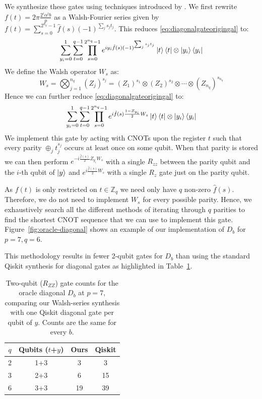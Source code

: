 \documentclass[aps,floatfix,10pt,amssymb,amsfont,amsmath,superscriptaddress,float,nofootinbib,longbibliography,nobalancelastpage,twocolumn]{revtex4-2}
\begin{document}
We synthesize these gates using techniques introduced by \cite{Welch_2014}. We first rewrite $f(t)= 2\pi  \frac{2^i\alpha^t b}{p}$ as a Walsh-Fourier series given by $f(t) = \sum_{s=0}^{2^{n_q}-1} \hat f(s) (-1)^{\sum_{j}s_jt_j}$. This reduces \eqref{eq:diagonalgateorigingal} to:
\begin{equation}
        \sum_{y_i=0}^1\sum_{t=0}^{q-1} \prod_{s=0}^{2^{n_q}-1}
        e^{iy_i \hat f(s)(-1)^{\sum_{j}s_jt_j}}\ket{t}\bra{t} \otimes \ket{y_i}\bra{y_i}
\end{equation}
We define the Walsh operator $W_s$ as:
\begin{equation}
    W_s = \bigotimes_{j=1}^{n_q} (Z_j)^{s_j} = (Z_1)^{s_1}\otimes (Z_2)^{s_2} \otimes \cdots \otimes (Z_{n_q})^{s_{n_q}}
\end{equation}
Hence we can further reduce \eqref{eq:diagonalgateorigingal} to:
\begin{equation}
        \sum_{y_i=0}^1\sum_{t=0}^{q-1} \prod_{s=0}^{2^{n_q}-1}
        e^{i\hat f(s)\frac{1-Z_{y_i}}{2} W_s}\ket{t}\bra{t} \otimes \ket{y_i}\bra{y_i}
\end{equation}
We implement this gate by acting with CNOTs upon the register $t$ such that every parity $\oplus_{j}t_j^{s_j}$ occurs at least once on some qubit. When that parity is stored we can then perform $e^{-i\frac{\hat f(s)}{2} Z_{y_i}W_s}$ with a single $R_{zz}$ between the parity qubit and the $i$-th qubit of $\ket{y}$ and $e^{i\frac{\hat f(s)}{2} W_s}$ with a single $R_z$ gate just on the parity qubit. 

As $f(t)$ is only restricted on $t \in \mathbb{Z}_q$ we need only have $q$ non-zero $\hat f(s)$. Therefore, we do not need to implement $W_s$ for every possible parity. Hence, we exhaustively search all the different methods of iterating through $q$ parities to find the shortest CNOT sequence that we can use to implement this gate. Figure~\ref{fig:oracle-diagonal} shows an example of our implementation of $D_b$ for $p=7, q=6$.

This methodology results in fewer 2-qubit gates for $D_b$ than using the standard Qiskit synthesis for diagonal gates \cite{shende2005synthesis} as highlighted in Table~\ref{tab:diagonal}.
\begin{table}[t]
\caption{Two-qubit ($R_{ZZ}$) gate counts for the oracle diagonal $D_b$ at $p=7$, comparing our Walsh-series synthesis with one Qiskit diagonal gate per qubit of $y$. Counts are the same for every $b$.}
\label{tab:diagonal}
\begin{tabular}{cccc}
\hline
$q$ & Qubits ($t$+$y$) & Ours & Qiskit \\
\hline
2 & 1+3 & 3  & 3  \\
3 & 2+3 & 6  & 15 \\
6 & 3+3 & 19 & 39 \\
\hline
\end{tabular}
\end{table}
\end{document}
